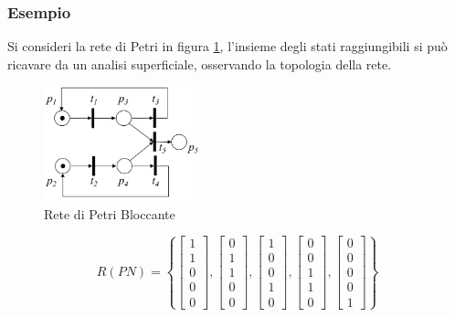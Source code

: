 \documentclass[10pt, letterpaper]{report}
\begin{document}
\subsubsection{Esempio}
Si consideri la rete di Petri in figura \ref{temporizzata1}, l'insieme degli stati raggiungibili si può ricavare da un analisi superficiale, osservando la topologia della rete. 
\begin{figure}[h!]
    \centering
    \includegraphics[width=0.4\textwidth]{images/temporizzata1.png}
    \caption{Rete di Petri Bloccante}
    \label{temporizzata1}
\end{figure}
$$ R(PN)=\left\{
\begin{bmatrix}1\\1\\0\\0\\0\end{bmatrix}, 
\begin{bmatrix}0\\1\\1\\0\\0\end{bmatrix}, 
\begin{bmatrix}1\\0\\0\\1\\0\end{bmatrix}, 
\begin{bmatrix}0\\0\\1\\1\\0\end{bmatrix},
\begin{bmatrix}0\\0\\0\\0\\1\end{bmatrix}
\right\} $$ 
\end{document}
